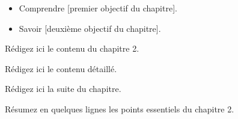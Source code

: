

\begin{objectifs}
\begin{itemize}
  \item Comprendre [premier objectif du chapitre].
  \item Savoir [deuxième objectif du chapitre].
\end{itemize}
\end{objectifs}


Rédigez ici le contenu du chapitre 2.


Rédigez ici le contenu détaillé.


Rédigez ici la suite du chapitre.

\begin{resume}
Résumez en quelques lignes les points essentiels du chapitre 2.
\end{resume}
